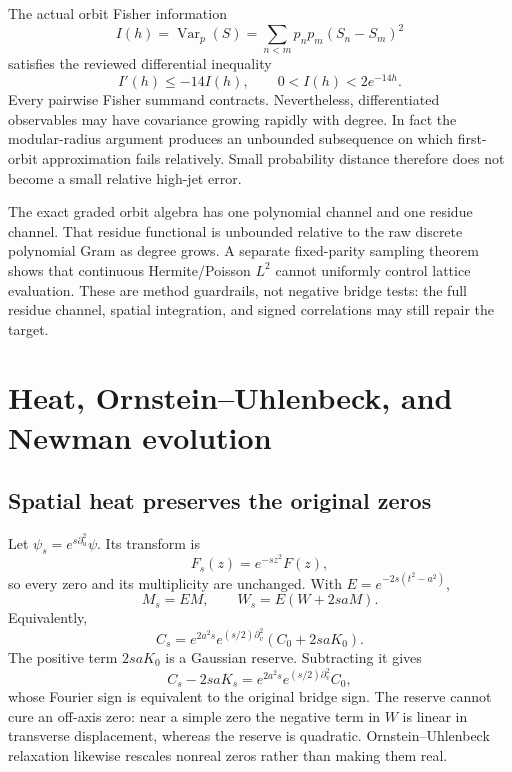 \documentclass[11pt]{article}
\theoremstyle{definition}
\theoremstyle{remark}
\newcommand{\Var}{\operatorname{Var}}
\begin{document}
The actual orbit Fisher information
\begin{equation}
 I(h)=\Var_p(S)=\sum_{n<m}p_np_m(S_n-S_m)^2
\end{equation}
satisfies the reviewed differential inequality
\begin{equation}
 I'(h)\le-14I(h),\qquad 0<I(h)<2e^{-14h}.
 \label{eq:orbit-fisher}
\end{equation}
Every pairwise Fisher summand contracts. Nevertheless, differentiated
observables may have covariance growing rapidly with degree. In fact the
modular-radius argument produces an unbounded subsequence on which first-orbit
approximation fails relatively. Small probability distance therefore does not
become a small relative high-jet error.

The exact graded orbit algebra has one polynomial channel and one residue
channel. That residue functional is unbounded relative to the raw discrete
polynomial Gram as degree grows. A separate fixed-parity sampling theorem shows
that continuous Hermite/Poisson $L^2$ cannot uniformly control lattice
evaluation. These are method guardrails, not negative bridge tests: the full
residue channel, spatial integration, and signed correlations may still repair
the target.

\section{Heat, Ornstein--Uhlenbeck, and Newman evolution}

\subsection{Spatial heat preserves the original zeros}

Let $\psi_s=e^{s\partial_u^2}\psi$. Its transform is
\begin{equation}
 F_s(z)=e^{-sz^2}F(z),
\end{equation}
so every zero and its multiplicity are unchanged. With
$E=e^{-2s(t^2-a^2)}$,
\begin{equation}
 M_s=EM,\qquad W_s=E(W+2saM).
\end{equation}
Equivalently,
\begin{equation}
 C_s=e^{2a^2s}e^{(s/2)\partial_v^2}(C_0+2saK_0).
\end{equation}
The positive term $2saK_0$ is a Gaussian reserve. Subtracting it gives
\begin{equation}
 C_s-2saK_s=e^{2a^2s}e^{(s/2)\partial_v^2}C_0,
\end{equation}
whose Fourier sign is equivalent to the original bridge sign. The reserve
cannot cure an off-axis zero: near a simple zero the negative term in $W$ is
linear in transverse displacement, whereas the reserve is quadratic.
Ornstein--Uhlenbeck relaxation likewise rescales nonreal zeros rather than
making them real.
\end{document}
